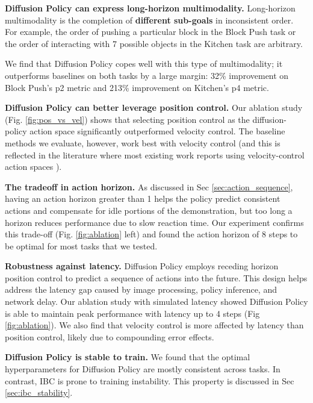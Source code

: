 \textbf{Diffusion Policy can express long-horizon multimodality.}
Long-horizon multimodality is the completion of \textbf{different sub-goals} in inconsistent order. For example, the order of pushing a particular block in the Block Push task or the order of interacting with 7 possible objects in the Kitchen task are arbitrary.

We find that Diffusion Policy copes well with this type of multimodality; it outperforms baselines on both tasks by a large margin: 32\% improvement on Block Push's p2 metric and 213\% improvement on Kitchen's p4 metric.

\textbf{Diffusion Policy can better leverage position control.}
\label{sec:eval_pos_vs_vel}
Our ablation study (Fig. \ref{fig:pos_vs_vel}) shows that selecting position control as the diffusion-policy action space significantly outperformed velocity control. The baseline methods we evaluate, however, work best with velocity control (and this is reflected in the literature where most existing work reports using velocity-control action spaces \cite{robomimic, bet, zhang2018deep, florence2019self, mandlekar2020learning, mandlekar2020iris}).





\textbf{The tradeoff in action horizon.}
As discussed in Sec \ref{sec:action_sequence}, 
having an action horizon greater than 1 helps the policy predict consistent actions and compensate for idle portions of the demonstration, but too long a horizon reduces performance due to slow reaction time. Our experiment confirms this trade-off (Fig. \ref{fig:ablation} left) and found the action horizon of 8 steps to be optimal for most tasks that we tested. 

\textbf{Robustness against latency.}
Diffusion Policy employs receding horizon position control to predict a sequence of actions into the future. This design helps address the latency gap caused by image processing, policy inference, and network delay. Our ablation study with simulated latency showed Diffusion Policy is able to maintain peak performance with latency up to 4 steps (Fig \ref{fig:ablation}). We also find that velocity control is more affected by latency than position control, likely due to compounding error effects.




\textbf{Diffusion Policy is stable to train.}
We found that the optimal hyperparameters for Diffusion Policy are mostly consistent across tasks.  In contrast,  IBC \cite{ibc} is prone to training instability. This property is discussed in Sec \ref{sec:ibc_stability}.















